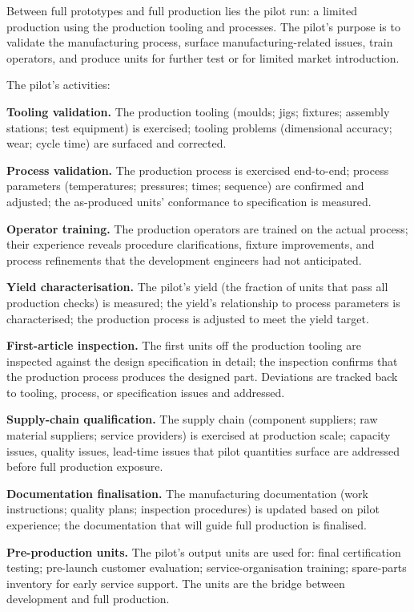 Between full prototypes and full production lies the pilot run: a limited production using the production tooling and processes. The pilot's purpose is to validate the manufacturing process, surface manufacturing-related issues, train operators, and produce units for further test or for limited market introduction.

The pilot's activities:

\textbf{Tooling validation.} The production tooling (moulds; jigs; fixtures; assembly stations; test equipment) is exercised; tooling problems (dimensional accuracy; wear; cycle time) are surfaced and corrected.

\textbf{Process validation.} The production process is exercised end-to-end; process parameters (temperatures; pressures; times; sequence) are confirmed and adjusted; the as-produced units' conformance to specification is measured.

\textbf{Operator training.} The production operators are trained on the actual process; their experience reveals procedure clarifications, fixture improvements, and process refinements that the development engineers had not anticipated.

\textbf{Yield characterisation.} The pilot's yield (the fraction of units that pass all production checks) is measured; the yield's relationship to process parameters is characterised; the production process is adjusted to meet the yield target.

\textbf{First-article inspection.} The first units off the production tooling are inspected against the design specification in detail; the inspection confirms that the production process produces the designed part. Deviations are tracked back to tooling, process, or specification issues and addressed.

\textbf{Supply-chain qualification.} The supply chain (component suppliers; raw material suppliers; service providers) is exercised at production scale; capacity issues, quality issues, lead-time issues that pilot quantities surface are addressed before full production exposure.

\textbf{Documentation finalisation.} The manufacturing documentation (work instructions; quality plans; inspection procedures) is updated based on pilot experience; the documentation that will guide full production is finalised.

\textbf{Pre-production units.} The pilot's output units are used for: final certification testing; pre-launch customer evaluation; service-organisation training; spare-parts inventory for early service support. The units are the bridge between development and full production.

